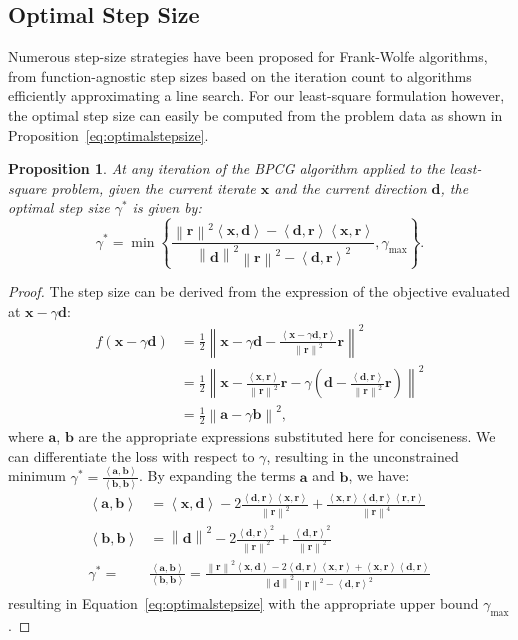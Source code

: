 \documentclass{ecai}
\newtheorem{proposition}[theorem]{Proposition}
\newcommand{\innp}[2]{\left\langle #1, #2 \right\rangle}
\newcommand{\norm}[1]{\left\| #1 \right\|}
\newcommand{\vx}{\mathbf{x}}
\newcommand{\vd}{\mathbf{d}}
\newcommand{\vr}{\mathbf{r}}
\begin{document}
\subsection{Optimal Step Size}

Numerous step-size strategies have been proposed for Frank-Wolfe algorithms, from function-agnostic step sizes based on the iteration count to algorithms efficiently approximating a line search.
For our least-square formulation however, the optimal step size can easily be computed from the problem data as shown in Proposition~\ref{eq:optimalstepsize}.

\begin{proposition}
At any iteration of the BPCG algorithm applied to the least-square problem, given the current iterate $\vx$ and the current direction $\vd$,
the optimal step size $\gamma^*$ is given by:
\begin{equation}\label{eq:optimalstepsize}
\gamma^* = \min \left\{\frac{ \norm{\vr}^2 \innp{\vx}{\vd} - \innp{\vd}{\vr} \innp{\vx}{\vr} }{ \norm{\vd}^2 \norm{\vr}^2 - \innp{\vd}{\vr}^2 }, \gamma_{\max} \right\}.
\end{equation}
\end{proposition}
\begin{proof}
The step size can be derived from the expression of the objective evaluated at $\vx - \gamma \vd$:
\begin{align*}
    f(\vx - \gamma \vd) & = \frac{1}{2} \left\| \vx - \gamma \vd - \frac{\innp{\vx - \gamma \vd}{\vr}}{\norm{\vr}^2} \vr \right\|^2 \\
    & = \frac12 \left\| \vx - \frac{\innp{\vx}{\vr}}{\norm{\vr}^2} \vr - \gamma \left(\vd - \frac{\innp{\vd}{\vr}}{\norm{\vr}^2} \vr\right) \right\|^2 \\
    &= \frac12 \left\| \mathbf{a} - \gamma \mathbf{b} \right\|^2,
\end{align*}
where $\mathbf{a}$, $\mathbf{b}$ are the appropriate expressions substituted here for conciseness.
We can differentiate the loss with respect to $\gamma$, resulting in the unconstrained minimum $\gamma^* = \frac{\innp{\mathbf{a}}{\mathbf{b}}}{\innp{\mathbf{b}}{\mathbf{b}}}$.
By expanding the terms $\mathbf{a}$ and $\mathbf{b}$, we have:
\begin{align*}
    \innp{\mathbf{a}}{\mathbf{b}} &= \innp{\vx}{\vd} - 2 \frac{\innp{\vd}{\vr} \innp{\vx}{\vr}}{\norm{\vr}^2} + \frac{\innp{\vx}{\vr} \innp{\vd}{\vr} \innp{\vr}{\vr}}{\norm{\vr}^4} \\
    \innp{\mathbf{b}}{\mathbf{b}} &= \norm{\vd}^2 - 2 \frac{\innp{\vd}{\vr}^2}{\norm{\vr}^2} + \frac{\innp{\vd}{\vr}^2}{\norm{\vr}^2} \\
    \gamma^* =& \frac{\innp{\mathbf{a}}{\mathbf{b}}}{\innp{\mathbf{b}}{\mathbf{b}}} = \frac{\norm{\vr}^2 \innp{\vx}{\vd} - 2\innp{\vd}{\vr}\innp{\vx}{\vr} + \innp{\vx}{\vr}\innp{\vd}{\vr}}{\norm{\vd}^2 \norm{\vr}^2 - \innp{\vd}{\vr}^2}
\end{align*}
resulting in Equation~\eqref{eq:optimalstepsize} with the appropriate upper bound $\gamma_{\max}$.
\end{proof}
\end{document}
